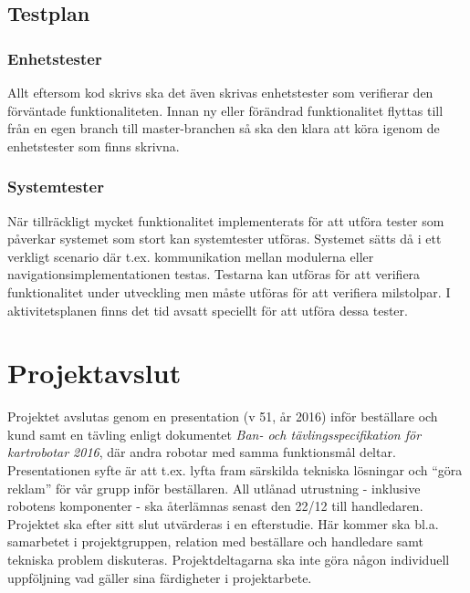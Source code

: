 \documentclass{article}
\begin{document}
\subsection{Testplan}
\subsubsection{Enhetstester}
Allt eftersom kod skrivs ska det även skrivas enhetstester som verifierar den förväntade funktionaliteten. Innan ny eller förändrad funktionalitet flyttas till från en egen branch till master-branchen så ska den klara att köra igenom de enhetstester som finns skrivna.

\subsubsection{Systemtester}
När tillräckligt mycket funktionalitet implementerats för att utföra tester som påverkar systemet som stort kan systemtester utföras. Systemet sätts då i ett verkligt scenario där t.ex. kommunikation mellan modulerna eller navigationsimplementationen testas. Testarna kan utföras för att verifiera funktionalitet under utveckling men måste utföras för att verifiera milstolpar. I aktivitetsplanen finns det tid avsatt speciellt för att utföra dessa tester.

\section{Projektavslut}
Projektet avslutas genom en presentation (v 51, år 2016) inför beställare och kund samt en tävling enligt dokumentet \textit{Ban- och tävlingsspecifikation för kartrobotar 2016}, där andra robotar med samma funktionsmål deltar. Presentationen syfte är att t.ex. lyfta fram särskilda tekniska lösningar och ``göra reklam'' för vår grupp inför beställaren. All utlånad utrustning - inklusive robotens komponenter - ska återlämnas senast den 22/12 till handledaren. Projektet ska efter sitt slut utvärderas i en efterstudie. Här kommer ska bl.a. samarbetet i projektgruppen, relation med beställare och handledare samt tekniska problem diskuteras. Projektdeltagarna ska inte göra någon individuell uppföljning vad gäller sina färdigheter i projektarbete.
\end{document}
